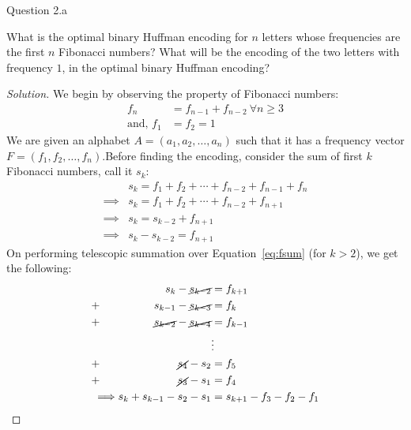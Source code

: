 \begin{solution}{Question 2.a}
    \begin{question}[]
        What is the optimal binary Huffman encoding for $n$ letters whose frequencies are the first $n$ Fibonacci numbers? What will be the encoding of the two letters with frequency $1$, in the optimal binary Huffman encoding?
    \end{question}
    \tcblower{}
    \begin{proof}[Solution]
        We begin by observing the property of Fibonacci numbers:
        \begin{equation}\label{eq:fib}
            \begin{split}
                f_n&=f_{n-1}+f_{n-2}\ \forall n\geq 3\\
                \text{and, } f_1&=f_2=1
            \end{split}
        \end{equation}
        We are given an alphabet $A=(a_1, a_2, \ldots,a_n)$ such that it has a frequency vector $F=(f_1, f_2, \ldots, f_n)$.Before finding the encoding, consider the sum of first $k$ Fibonacci numbers, call it $s_k$:
        \begin{equation}\label{eq:fsum}
            \begin{split}
                &s_k=f_1+f_2+\cdots+f_{n-2}+f_{n-1}+f_n\\
                \implies &s_k=f_1+f_2+\cdots+f_{n-2}+f_{n+1}\\
                \implies &s_k=s_{k-2}+f_{n+1}\\
                \implies &s_k-s_{k-2}=f_{n+1}
            \end{split}
        \end{equation}
        On performing telescopic summation over Equation~\ref{eq:fsum} (for $k>2$), we get the following:
        \begin{equation}\label{eq:skeval}
            \begin{alignedat}{4}
                & &s_k-\cancel{s_{k-2}} &=f_{k+1}\\
                &+ &s_{k-1}-\cancel{s_{k-3}} &=f_{k}\\
                &+ &\cancel{s_{k-2}}-\cancel{s_{k-4}} &=f_{k-1}\\
                & & &\vdots\\
                &+ &\cancel{s_4}-s_2 &=f_5\\
                &+ &\cancel{s_3}-s_1 &=f_4\\
                &\implies &s_k+s_{k-1}-s_2-s_1 &=s_{k+1}-f_3-f_2-f_1\\

\end{alignedat}
\end{equation}
\end{proof}
\end{solution}
